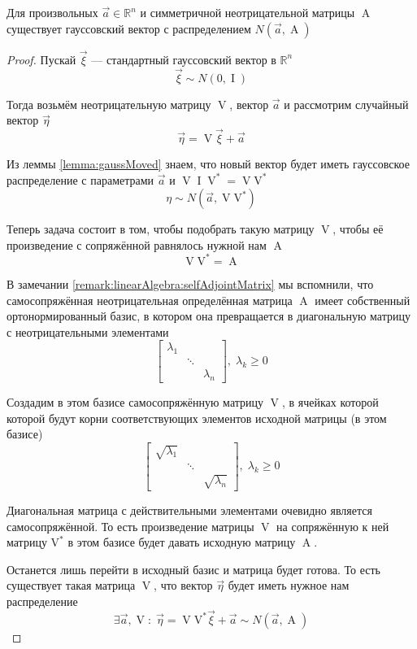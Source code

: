 \begin{theorem}\label{theorem:gaussianVectorExistance}
  Для произвольных $\vec{a} \in \mathbb{R}^n$ и симметричной неотрицательной
  матрицы $\operatorname{A}$ существует гауссовский вектор с распределением
  $N\left( \vec{a}, \operatorname{A} \right)$
\end{theorem}
\begin{proof}
  Пускай $\vec{\xi}$ --- стандартный гауссовский вектор в $\mathbb{R}^n$
  $$\vec{\xi} \sim N\left( 0, \operatorname{I} \right)$$

  Тогда возьмём неотрицательную матрицу $\operatorname{V}$, вектор $\vec{a}$ и
  рассмотрим случайный вектор $\vec{\eta}$
  $$\vec{\eta} = \operatorname{V} \vec{\xi} + \vec{a}$$

  Из леммы \ref{lemma:gaussMoved} знаем, что новый вектор будет иметь
  гауссовское распределение с параметрами
  $\vec{a}$ и $\operatorname{V} \operatorname{I} \operatorname{V}^* 
  = \operatorname{V} \operatorname{V^*}$
  $$\eta \sim N\left( \vec{a}, \operatorname{V} \operatorname{V^*} \right)$$

  Теперь задача состоит в том, чтобы подобрать такую матрицу $\operatorname{V}$,
  чтобы её произведение с сопряжённой равнялось нужной нам $\operatorname{A}$
  $$\operatorname{V} \operatorname{V^*} = \operatorname{A}$$

  В замечании \ref{remark:linearAlgebra:selfAdjointMatrix} мы вспомнили,
  что самосопряжённая неотрицательная определённая матрица $\operatorname{A}$
  имеет собственный ортонормированный базис, в котором она превращается в
  диагональную матрицу с неотрицательными элементами
  $$
  \begin{bmatrix}
      \lambda_1 & & \\
      & \ddots &  \\
      & & \lambda_n
  \end{bmatrix},\;
      \lambda_k \ge 0$$

  Создадим в этом базисе самосопряжённую матрицу $\operatorname{V}$, в ячейках
  которой которой будут корни соответствующих элементов исходной матрицы
  (в этом базисе)
  $$
  \begin{bmatrix}
      \sqrt{\lambda_1} & & \\
      & \ddots &  \\
      & & \sqrt{\lambda_n}
  \end{bmatrix},\; \lambda_k \ge 0$$

  Диагональная матрица с действительными элементами очевидно является
  самосопряжённой. То есть произведение матрицы $\operatorname{V}$ на
  сопряжённую к ней матрицу $\operatorname{V^*}$ в этом базисе будет давать
  исходную матрицу $\operatorname{A}$.

  Останется лишь перейти в исходный базис и матрица будет готова. То есть
  существует такая матрица $\operatorname{V}$, что вектор $\vec{\eta}$ будет
  иметь нужное нам распределение
  $$\exists \vec{a}, \operatorname{V}:\;
      \vec{\eta} = \operatorname{V} \operatorname{V^*} \vec{\xi} + \vec{a}
      \sim N\left( \vec{a}, \operatorname{A} \right)$$
\end{proof}

